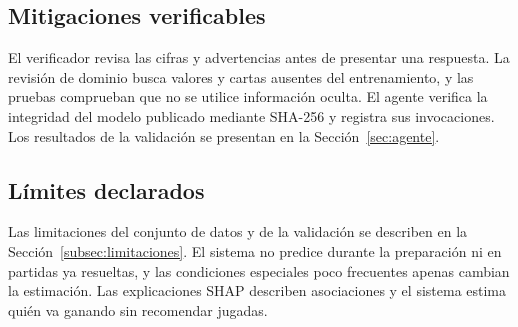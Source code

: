 \subsection{Mitigaciones verificables}
\label{subsec:mitigacionetica}

El verificador revisa las cifras y advertencias antes de presentar una
respuesta. La revisión de dominio busca valores y cartas ausentes del
entrenamiento, y las pruebas comprueban que no se utilice información oculta.
El agente verifica la integridad del modelo publicado mediante SHA-256 y
registra sus invocaciones. Los resultados de la validación se presentan en
la Sección~\ref{sec:agente}.

\subsection{Límites declarados}
\label{subsec:limitesgeneralizacion}

Las limitaciones del conjunto de datos y de la validación se describen en
la Sección~\ref{subsec:limitaciones}. El sistema no predice durante la
preparación ni en partidas ya resueltas, y las condiciones especiales poco
frecuentes apenas cambian la estimación. Las explicaciones SHAP describen
asociaciones y el sistema estima quién va ganando sin recomendar jugadas.
